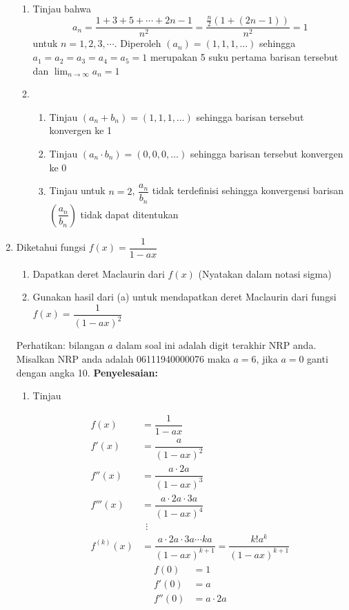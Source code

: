 \documentclass{article}
\begin{document}
\begin{enumerate}
\begin{enumerate}
		\item Tinjau bahwa 
		$$ a_n = \dfrac{1+3+5+\cdots +2n-1}{n^2} =\dfrac{\frac{n}{2}(1+(2n-1))}{n^2}=1$$
		untuk $n=1,2,3,\cdots$. Diperoleh $(a_n)=(1,1,1,\dots)$ sehingga $a_1=a_2=a_3=a_4=a_5=1$ merupakan 5 suku pertama barisan tersebut dan $\displaystyle \lim_{n\rightarrow \infty} a_n=1$ 
		\item \begin{enumerate}
		\item Tinjau $(a_n+b_n)=(1,1,1,\dots)$ sehingga barisan tersebut konvergen ke 1
		\item Tinjau $(a_n\cdot b_n)=(0,0,0,\dots)$ sehingga barisan tersebut konvergen ke 0
		\item Tinjau untuk $n=2$, $\dfrac{a_n}{b_n}$ tidak terdefinisi sehingga konvergensi barisan $\left(\dfrac{a_n}{b_n}\right)$ tidak dapat ditentukan
		\end{enumerate}
	\end{enumerate}
	\item Diketahui fungsi $f(x)=\dfrac{1}{1-ax}$
	\begin{enumerate}
		\item Dapatkan deret Maclaurin dari $f(x)$ (Nyatakan dalam notasi sigma)
		\item Gunakan hasil dari (a) untuk mendapatkan deret Maclaurin dari fungsi $f(x)=\dfrac{1}{(1-ax)^2}$
	\end{enumerate}
	Perhatikan: bilangan $a$ dalam soal ini adalah digit terakhir NRP anda. Misalkan NRP anda adalah 06111940000076 maka $a=6$, jika $a=0$ ganti dengan angka 10.\newpage
	\textbf{Penyelesaian:}
	\begin{enumerate}
		\item Tinjau 
		\begin{multicols}{2}
		\begin{align*}
		f(x) &= \dfrac{1}{1-ax}\\
		f'(x) &= \dfrac{a}{(1-ax)^2}\\
		f''(x) &= \dfrac{a\cdot 2a}{(1-ax)^3}\\
		f'''(x) &= \dfrac{a\cdot 2a\cdot 3a}{(1-ax)^4}\\
		&~~\vdots\\
		f^{(k)}(x) &= \dfrac{a\cdot 2a\cdot 3a\cdots ka}{(1-ax)^{k+1}} = \dfrac{k!a^k}{(1-ax)^{k+1}}
		\end{align*}
		\begin{align*}
		f(0) &= 1\\
		f'(0) &= a\\
		f''(0) &= a\cdot 2a\\

\end{align*}
\end{multicols}
\end{enumerate}
\end{enumerate}
\end{document}
